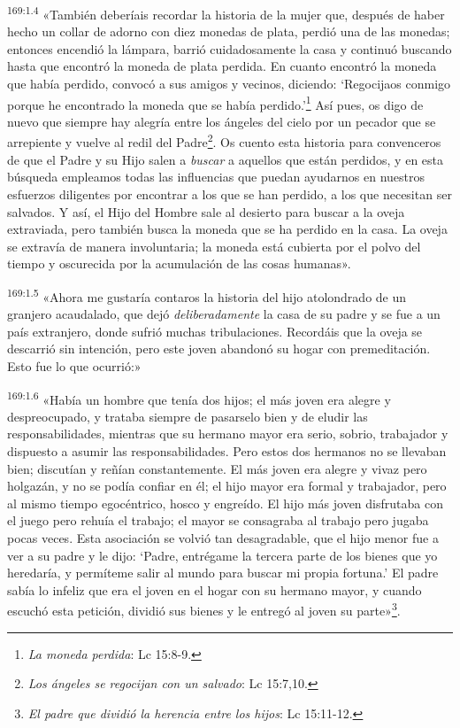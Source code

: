 \par 
\textsuperscript{169:1.4} «También deberíais recordar la historia de la mujer que, después de haber hecho un collar de adorno con diez monedas de plata, perdió una de las monedas; entonces encendió la lámpara, barrió cuidadosamente la casa y continuó buscando hasta que encontró la moneda de plata perdida. En cuanto encontró la moneda que había perdido, convocó a sus amigos y vecinos, diciendo: `Regocijaos conmigo porque he encontrado la moneda que se había perdido.'\footnote{\textit{La moneda perdida}: Lc 15:8-9.} Así pues, os digo de nuevo que siempre hay alegría entre los ángeles del cielo por un pecador que se arrepiente y vuelve al redil del Padre\footnote{\textit{Los ángeles se regocijan con un salvado}: Lc 15:7,10.}. Os cuento esta historia para convenceros de que el Padre y su Hijo salen a \textit{buscar} a aquellos que están perdidos, y en esta búsqueda empleamos todas las influencias que puedan ayudarnos en nuestros esfuerzos diligentes por encontrar a los que se han perdido, a los que necesitan ser salvados. Y así, el Hijo del Hombre sale al desierto para buscar a la oveja extraviada, pero también busca la moneda que se ha perdido en la casa. La oveja se extravía de manera involuntaria; la moneda está cubierta por el polvo del tiempo y oscurecida por la acumulación de las cosas humanas».

\par 
\textsuperscript{169:1.5} «Ahora me gustaría contaros la historia del hijo atolondrado de un granjero acaudalado, que dejó \textit{deliberadamente} la casa de su padre y se fue a un país extranjero, donde sufrió muchas tribulaciones. Recordáis que la oveja se descarrió sin intención, pero este joven abandonó su hogar con premeditación. Esto fue lo que ocurrió:»

\par 
\textsuperscript{169:1.6} «Había un hombre que tenía dos hijos; el más joven era alegre y despreocupado, y trataba siempre de pasarselo bien y de eludir las responsabilidades, mientras que su hermano mayor era serio, sobrio, trabajador y dispuesto a asumir las responsabilidades. Pero estos dos hermanos no se llevaban bien; discutían y reñían constantemente. El más joven era alegre y vivaz pero holgazán, y no se podía confiar en él; el hijo mayor era formal y trabajador, pero al mismo tiempo egocéntrico, hosco y engreído. El hijo más joven disfrutaba con el juego pero rehuía el trabajo; el mayor se consagraba al trabajo pero jugaba pocas veces. Esta asociación se volvió tan desagradable, que el hijo menor fue a ver a su padre y le dijo: `Padre, entrégame la tercera parte de los bienes que yo heredaría, y permíteme salir al mundo para buscar mi propia fortuna.' El padre sabía lo infeliz que era el joven en el hogar con su hermano mayor, y cuando escuchó esta petición, dividió sus bienes y le entregó al joven su parte»\footnote{\textit{El padre que dividió la herencia entre los hijos}: Lc 15:11-12.}.

